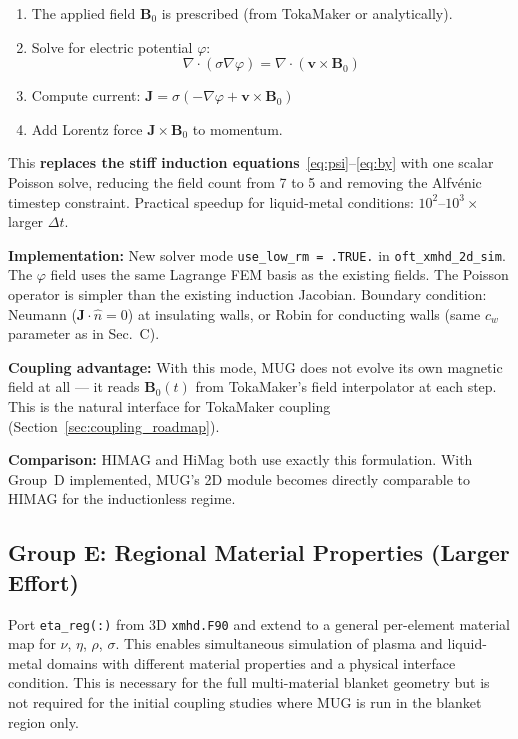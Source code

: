 \documentclass[11pt,letterpaper]{article}
\begin{document}
\begin{enumerate}
  \item The applied field $\mathbf{B}_0$ is prescribed (from TokaMaker or
    analytically).
  \item Solve for electric potential $\varphi$:
    \begin{equation}
      \nabla\cdot(\sigma\nabla\varphi) = \nabla\cdot(\mathbf{v}\times\mathbf{B}_0)
      \label{eq:phi_poisson}
    \end{equation}
  \item Compute current:
    $\mathbf{J} = \sigma(-\nabla\varphi + \mathbf{v}\times\mathbf{B}_0)$
  \item Add Lorentz force $\mathbf{J}\times\mathbf{B}_0$ to momentum.
\end{enumerate}

This \textbf{replaces the stiff induction equations}~\eqref{eq:psi}--\eqref{eq:by}
with one scalar Poisson solve, reducing the field count from 7 to 5 and
removing the Alfv\'{e}nic timestep constraint.  Practical speedup for
liquid-metal conditions: $10^2$--$10^3\times$ larger $\Delta t$.

\textbf{Implementation:} New solver mode \texttt{use\_low\_rm = .TRUE.} in
\texttt{oft\_xmhd\_2d\_sim}.  The $\varphi$ field uses the same Lagrange
FEM basis as the existing fields.  The Poisson operator is simpler than the
existing induction Jacobian.  Boundary condition: Neumann
($\mathbf{J}\cdot\hat{n} = 0$) at insulating walls, or Robin for conducting
walls (same $c_w$ parameter as in Sec.\ C).

\textbf{Coupling advantage:} With this mode, MUG does not evolve its own
magnetic field at all --- it reads $\mathbf{B}_0(t)$ from TokaMaker's field
interpolator at each step.  This is the natural interface for TokaMaker coupling
(Section~\ref{sec:coupling_roadmap}).

\textbf{Comparison:} HIMAG and HiMag both use exactly this formulation.
With Group~D implemented, MUG's 2D module becomes directly comparable to HIMAG
for the inductionless regime.

\subsection{Group E: Regional Material Properties (Larger Effort)}

Port \texttt{eta\_reg(:)} from 3D \texttt{xmhd.F90} and extend to a general
per-element material map for $\nu$, $\eta$, $\rho$, $\sigma$.  This enables
simultaneous simulation of plasma and liquid-metal domains with different
material properties and a physical interface condition.  This is necessary for
the full multi-material blanket geometry but is not required for the initial
coupling studies where MUG is run in the blanket region only.
\end{document}

